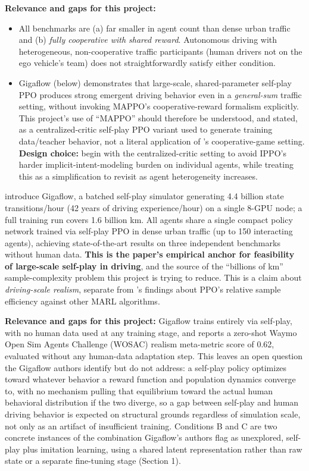 \documentclass[11pt]{article}
\begin{document}
\textbf{Relevance and gaps for this project:}
\begin{itemize}
\item All benchmarks are (a) far smaller in agent count than dense urban traffic and (b) \emph{fully cooperative with shared reward}. Autonomous driving with heterogeneous, non-cooperative traffic participants (human drivers not on the ego vehicle's team) does not straightforwardly satisfy either condition.
\item Gigaflow (below) demonstrates that large-scale, shared-parameter self-play PPO produces strong emergent driving behavior even in a \emph{general-sum} traffic setting, without invoking MAPPO's cooperative-reward formalism explicitly. This project's use of ``MAPPO'' should therefore be understood, and stated, as a centralized-critic self-play PPO variant used to generate training data/teacher behavior, not a literal application of \citeauthor{yu2021mappo}'s cooperative-game setting. \textbf{Design choice:} begin with the centralized-critic setting to avoid IPPO's harder implicit-intent-modeling burden on individual agents, while treating this as a simplification to revisit as agent heterogeneity increases.
\end{itemize}

\citet{cusumanotowner2025gigaflow} introduce Gigaflow, a batched self-play simulator generating 4.4 billion state transitions/hour (42 years of driving experience/hour) on a single 8-GPU node; a full training run covers 1.6 billion km. All agents share a single compact policy network trained via self-play PPO in dense urban traffic (up to 150 interacting agents), achieving state-of-the-art results on three independent benchmarks without human data. \textbf{This is the paper's empirical anchor for feasibility of large-scale self-play in driving}, and the source of the ``billions of km'' sample-complexity problem this project is trying to reduce. This is a claim about \emph{driving-scale realism}, separate from \citet{yu2021mappo}'s findings about PPO's relative sample efficiency against other MARL algorithms.

\textbf{Relevance and gaps for this project:} Gigaflow trains entirely via self-play, with no human data used at any training stage, and reports a zero-shot Waymo Open Sim Agents Challenge (WOSAC) realism meta-metric score of 0.62, evaluated without any human-data adaptation step. This leaves an open question the Gigaflow authors identify but do not address: a self-play policy optimizes toward whatever behavior a reward function and population dynamics converge to, with no mechanism pulling that equilibrium toward the actual human behavioral distribution if the two diverge, so a gap between self-play and human driving behavior is expected on structural grounds regardless of simulation scale, not only as an artifact of insufficient training. Conditions B and C are two concrete instances of the combination Gigaflow's authors flag as unexplored, self-play plus imitation learning, using a shared latent representation rather than raw state or a separate fine-tuning stage (Section 1).
\end{document}
